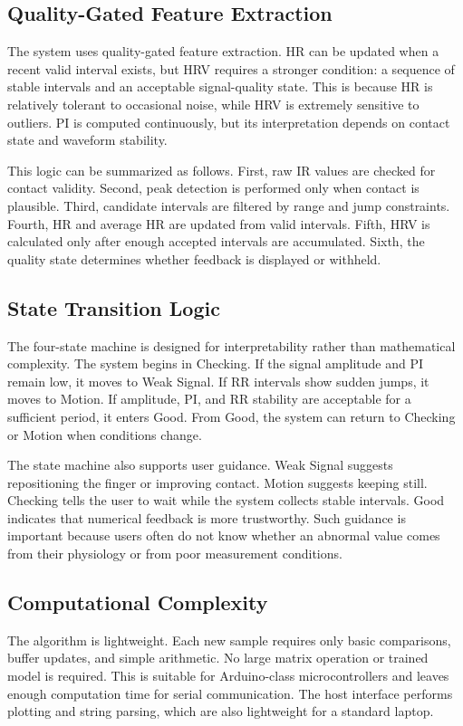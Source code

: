 \documentclass[10pt,conference]{IEEEtran}
\begin{document}
\subsection{Quality-Gated Feature Extraction}
The system uses quality-gated feature extraction. HR can be updated when a recent valid interval exists, but HRV requires a stronger condition: a sequence of stable intervals and an acceptable signal-quality state. This is because HR is relatively tolerant to occasional noise, while HRV is extremely sensitive to outliers. PI is computed continuously, but its interpretation depends on contact state and waveform stability.

This logic can be summarized as follows. First, raw IR values are checked for contact validity. Second, peak detection is performed only when contact is plausible. Third, candidate intervals are filtered by range and jump constraints. Fourth, HR and average HR are updated from valid intervals. Fifth, HRV is calculated only after enough accepted intervals are accumulated. Sixth, the quality state determines whether feedback is displayed or withheld.

\subsection{State Transition Logic}
The four-state machine is designed for interpretability rather than mathematical complexity. The system begins in Checking. If the signal amplitude and PI remain low, it moves to Weak Signal. If RR intervals show sudden jumps, it moves to Motion. If amplitude, PI, and RR stability are acceptable for a sufficient period, it enters Good. From Good, the system can return to Checking or Motion when conditions change.

The state machine also supports user guidance. Weak Signal suggests repositioning the finger or improving contact. Motion suggests keeping still. Checking tells the user to wait while the system collects stable intervals. Good indicates that numerical feedback is more trustworthy. Such guidance is important because users often do not know whether an abnormal value comes from their physiology or from poor measurement conditions.

\subsection{Computational Complexity}
The algorithm is lightweight. Each new sample requires only basic comparisons, buffer updates, and simple arithmetic. No large matrix operation or trained model is required. This is suitable for Arduino-class microcontrollers and leaves enough computation time for serial communication. The host interface performs plotting and string parsing, which are also lightweight for a standard laptop.
\end{document}
